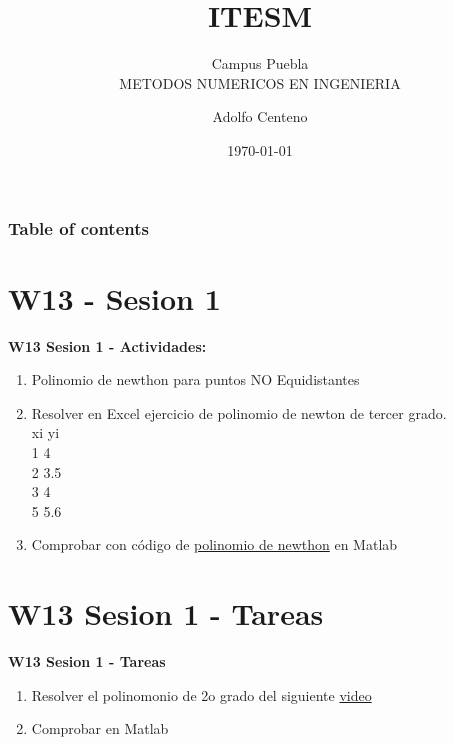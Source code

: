 \documentclass{beamer}
\begin{document}
\title{ITESM}  
\subtitle{Campus Puebla\\METODOS NUMERICOS EN INGENIERIA
}
\author{Adolfo Centeno}
\date{\today} 


\begin{frame}
\titlepage
\end{frame}

\begin{frame}\frametitle{Table of contents}
\tableofcontents
\end{frame} 


\section{W13 - Sesion 1 }

\begin{frame}

\textbf{W13 Sesion 1 - Actividades:}

\begin{enumerate}
\item
	 Polinomio de newthon para puntos NO Equidistantes

\item
	Resolver en Excel  ejercicio de polinomio de newton de tercer grado. \\
	
xi	yi \\
1	4 \\
2	3.5 \\
3	4 \\
5   5.6

\item Comprobar con código de \href{https://github.com/adsoftsito/metodos-numericos/blob/master/w12/polinomionewthon/polnewton.pdf}{polinomio de newthon} en Matlab
\end{enumerate} 

\end{frame}


\section{W13 Sesion 1 - Tareas }

\begin{frame}


\textbf{W13 Sesion 1 - Tareas}


\begin{enumerate}
\item

Resolver el polinomonio de 2o grado del siguiente \href{https://www.youtube.com/watch?v=AISHH6goWUs}{video}


\item
	Comprobar en Matlab


\end{enumerate} 


\end{frame}
\end{document}
